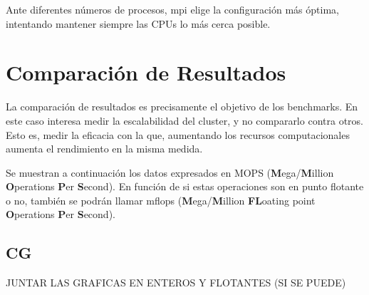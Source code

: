 Ante diferentes números de procesos, \acrshort{mpi} elige la configuración más óptima, intentando mantener siempre las CPUs lo más cerca posible.

\section{Comparación de Resultados}
\label{sec:comparacion_resultados}
La comparación de resultados es precisamente el objetivo de los benchmarks. En este caso interesa medir la escalabilidad del cluster, y no compararlo contra otros. Esto es, medir la eficacia con la que, aumentando los recursos computacionales aumenta el rendimiento en la misma medida.

Se muestran a continuación los datos expresados en MOPS (\textbf{M}ega/\textbf{M}illion \textbf{O}perations \textbf{P}er \textbf{S}econd). En función de si estas operaciones son en punto flotante o no, también se podrán llamar \acrshort{mflops} (\textbf{M}ega/\textbf{M}illion \textbf{FL}oating point \textbf{O}perations \textbf{P}er \textbf{S}econd).

\subsection{CG}
JUNTAR LAS GRAFICAS EN ENTEROS Y FLOTANTES (SI SE PUEDE)


